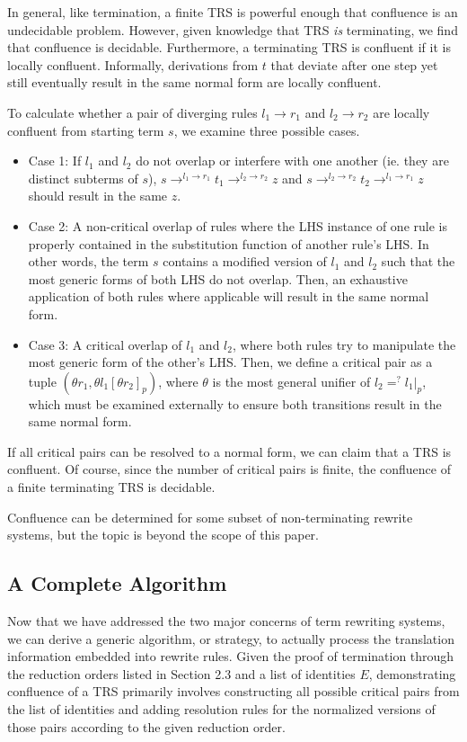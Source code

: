 \documentclass{article}
\begin{document}
In general, like termination, a finite TRS is powerful enough that confluence is an undecidable problem.
However, given knowledge that TRS \textit{is} terminating, we find that confluence is decidable.
Furthermore, a terminating TRS is confluent if it is locally confluent. Informally, derivations from $t$
that deviate after one step yet still eventually result in the same normal form are locally confluent.

To calculate whether a pair of diverging rules $l_1 \rightarrow r_1$ and $l_2 \rightarrow r_2$ are locally confluent from starting term $s$, we examine three possible cases.
\begin{itemize}
    \item Case 1: If $l_1$ and $l_2$ do not overlap or interfere with one another (ie. they are distinct subterms of $s$),
    $s \rightarrow^{l_1 \rightarrow r_1} t_1 \rightarrow^{l_2 \rightarrow r_2} z$ and
    $s \rightarrow^{l_2 \rightarrow r_2} t_2 \rightarrow^{l_1 \rightarrow r_1} z$ should result in the same $z$.
    \item Case 2: A non-critical overlap of rules where the LHS instance of one rule is properly contained in the substitution function of another rule's LHS.
    In other words, the term $s$ contains a modified version of $l_1$ and $l_2$ such that the most generic forms of both LHS do not overlap.
    Then, an exhaustive application of both rules where applicable will result in the same normal form.
    \item Case 3: A critical overlap of $l_1$ and $l_2$, where both rules try to manipulate the most generic form of the other's LHS.
    Then, we define a critical pair as a tuple $(\theta r_1, \theta l_1[\theta r_2]_p)$, where $\theta$ is the most general unifier of $l_2 =^? l_1|_p$,
    which must be examined externally to ensure both transitions result in the same normal form.
\end{itemize}
If all critical pairs can be resolved to a normal form, we can claim that a TRS is confluent.
Of course, since the number of critical pairs is finite, the confluence of a finite terminating TRS is decidable.

Confluence can be determined for some subset of non-terminating rewrite systems, but the topic is beyond the scope of this paper.

\subsection{A Complete Algorithm}
Now that we have addressed the two major concerns of term rewriting systems, we can derive a generic algorithm, or strategy,
to actually process the translation information embedded into rewrite rules. Given the proof of termination
through the reduction orders listed in Section 2.3 and a list of identities $E$, demonstrating confluence of a TRS primarily
involves constructing all possible critical pairs from the list of identities
and adding resolution rules for the normalized versions of those pairs according to the given reduction order.
\end{document}
